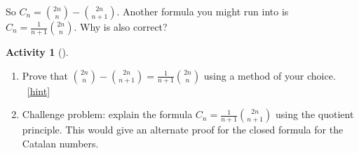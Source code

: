 \documentclass[10pt,]{book}
\theoremstyle{plain}
\theoremstyle{definition}
\theoremstyle{definition}
\theoremstyle{definition}
\newtheorem{activity}[project]{Activity}
\numberwithin{equation}{chapter}
\begin{document}
\hypertarget{p-1038}{}%
So \(C_n = \binom{2n}{n} - \binom{2n}{n+1}\).  Another formula you might run into is \(C_n = \frac{1}{n+1}\binom{2n}{n}\).  Why is also correct?%
\begin{activity}[]\label{activity-176}
\leavevmode%
\begin{enumerate}[font=\bfseries,label=(\alph*),ref=\alph*]
\item\label{task-197} \hypertarget{p-1039}{}%
Prove that \(\binom{2n}{n} - \binom{2n}{n+1} = \frac{1}{n+1}\binom{2n}{n}\) using a method of your choice.%
~\hfill{\tiny\hyperlink{a-183.a}{[hint]}\hypertarget{q-183.a}{}}\item\label{task-198} \hypertarget{p-1041}{}%
Challenge problem: explain the formula \(C_n = \frac{1}{n+1}\binom{2n}{n+1}\) using the quotient principle.  This would give an alternate proof for the closed formula for the Catalan numbers.%
\end{enumerate}
\end{activity}
\typeout{************************************************}
\typeout{************************************************}
\end{document}
